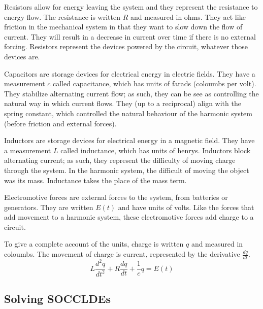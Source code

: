 \documentclass[fleqn,letterpaper]{report}
\begin{document}
\begin{smallitemize}
\item Resistors allow for energy leaving the system and they represent the
resistance to energy flow. The resistance is written $R$ and
measured in
ohms. They act like friction in the mechanical system in that
they want to slow down the flow of current. They will result
in a decrease in current over time if there is no external
forcing. Resistors represent the devices powered by the
circuit, whatever those devices are.
\item Capacitors are storage devices for electrical energy in
electric fields. They have a measurement $c$ called
capacitance, which has units of farads (coloumbs per volt).
They stabilize alternating current flow; as such, they can be
see as controlling the natural way in which current flows.
They (up to a reciprocal) align with the spring constant,
which controlled the natural behaviour of the harmonic system
(before friction and external forces). 
\item Inductors are
storage devices for electrical energy in a magnetic field.
They have a measurement $L$ called inductance, which has units
of henrys. Inductors block alternating current; as such, they
represent the difficulty of moving charge through the system.
In the harmonic system, the difficult of moving the object was
its mass. Inductance takes the place of the mass term.
\item Electromotive forces are external forces to the
system, from batteries or generators. They are written 
$E(t)$ and have units of volts. Like the forces that add
movement to a harmonic system, these electromotive forces add
charge to a circuit.
\item To give a complete account of the units, charge is
written $q$ and measured in coloumbs. The
movement of charge is current, represented by the derivative
$\frac{dq}{dt}$. 
\begin{equation*}
L \frac{d^2 q}{dt^2} + R \frac{dq}{dt} + \frac{1}{c} q = E(t)
\end{equation*}
\end{smallitemize}

\subsection{Solving SOCCLDEs}
\label{solving-soccldes}
\end{document}
